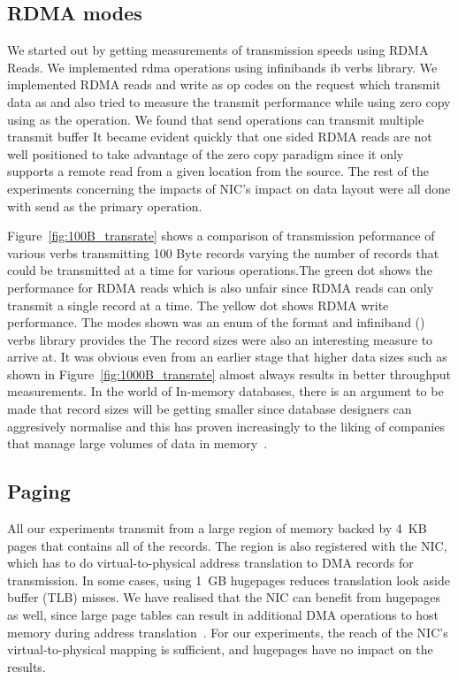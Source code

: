 


\subsection{RDMA modes}
We started out by getting measurements of transmission speeds using RDMA Reads.
We implemented rdma operations using infinibands ib verbs library. We implemented 
RDMA reads and write as op codes on the  request which 
transmit data as  and also tried to measure the transmit
performance while using zero copy using  as the operation.
We found that send operations can transmit multiple transmit buffer
It became evident quickly that one sided RDMA reads are not well positioned to 
take advantage of the zero copy paradigm since it only supports a remote read 
from a given location from the source. The rest of the experiments concerning
the impacts of NIC's impact on data layout were all done with send as the primary
operation. 


Figure~\ref{fig:100B_transrate} shows a comparison of transmission
peformance of various verbs transmitting 100 Byte records varying the number of records
that could be transmitted at a time for various operations.The green dot shows
the performance for RDMA reads which is also unfair
since RDMA reads can only transmit a single record at a time. The yellow dot
shows RDMA write performance. The modes shown was an enum of the format 
 and infiniband 
() verbs library provides the  The record sizes were 
also an interesting measure to arrive at. It was obvious even from an earlier stage
that higher data sizes such as shown in Figure~\ref{fig:1000B_transrate} almost 
always results in better throughput measurements. In the world of In-memory databases,
there is an argument to be made that record sizes will be getting smaller since 
database designers can aggresively normalise and this has proven increasingly to
the liking of companies that manage large volumes of data in memory~\cite{fb-memcache,fb-workload}.


\subsection{Paging}
All our experiments transmit from a large region of memory backed by 4~KB pages
that contains all of the records. The region is also
registered with the NIC, which has to do virtual-to-physical address
translation to DMA records for transmission.
In some cases, using 1~GB hugepages reduces translation look aside buffer
(TLB) misses. We have realised that the NIC can benefit from
hugepages as well, since large page tables can result in additional
DMA operations to host memory during address translation~\cite{farm,rdma}. For
our experiments, the reach of the NIC's virtual-to-physical mapping is
sufficient, and hugepages have no impact on the results.



